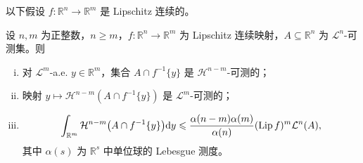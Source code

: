 \documentclass[../../main.tex]{subfiles}%
\begin{document}
以下假设 $f:\mathbb{R}^n\to\mathbb{R}^m$ 是 Lipschitz 连续的。%

\begin{lemma}\label{lemma:ch03-3-5}
设 $n,m$ 为正整数，$n\geqslant m$，$f:\mathbb{R}^n\to\mathbb{R}^m$ 为 Lipschitz 连续映射，$A\subseteq\mathbb{R}^n$ 为 $\mathcal{L}^n$-可测集。则
\begin{enumerate}[(i)]
\item 对 $\mathcal{L}^m$-a.e. $y\in\mathbb{R}^m$，集合 $A\cap f^{-1}\{y\}$ 是 $\mathcal{H}^{n-m}$-可测的；
\item 映射 $y\mapsto\mathcal{H}^{n-m}(A\cap f^{-1}\{y\})$ 是 $\mathcal{L}^m$-可测的；
\item \begin{align*}
\int_{\mathbb{R}^m}\mathcal{H}^{n-m}\bigl(A\cap f^{-1}\{y\}\bigr)\mathrm{d} y\leqslant\frac{\alpha(n-m)\alpha(m)}{\alpha(n)}(\operatorname{Lip} f)^m\mathcal{L}^n(A),
\end{align*}
其中 $\alpha(s)$ 为 $\mathbb{R}^s$ 中单位球的 Lebesgue 测度。
\end{enumerate}
\end{lemma}
\end{document}
